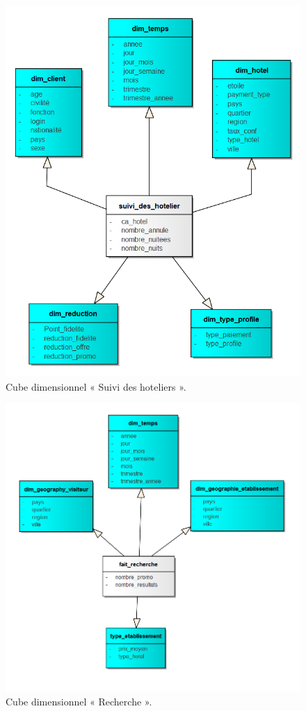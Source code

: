 \begin{figure}[!htbp]
	\begin{center}
		\includegraphics[scale=0.85]{images/cube_hotelier.png}
		\caption{Cube dimensionnel « Suivi des hoteliers ».}
		\label{use_bi_tools}
	\end{center}
\end{figure}

\begin{figure}[!htbp]
	\begin{center}
		\includegraphics[scale=0.85]{images/cube_recherche.png}
		\caption{Cube dimensionnel « Recherche ».}
		\label{use_bi_tools}
	\end{center}
\end{figure}

